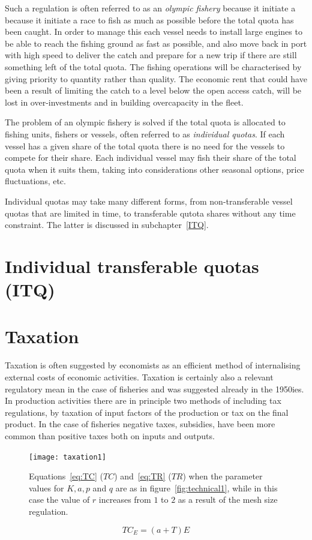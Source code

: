 \documentclass[11pt,fleqn]{book} %
\begin{document}
Such a regulation is often referred to as an \textit{olympic fishery} because it initiate a because it initiate a race to fish as much as possible before the total quota has been caught. In order to manage this each vessel needs to install large engines to be able to reach the fishing ground as fast as possible, and also move back in port with high speed to deliver the catch and prepare for a new trip if there are still something left of the total quota. The fishing operations will be characterised by giving priority to quantity rather than quality. The economic rent that could have been a result of limiting the catch to a level below the open access catch, will be lost in over-investments and in building overcapacity in the fleet.

The problem of an olympic fishery is solved if the total quota is allocated to fishing units, fishers or vessels, often referred to as \textit{individual quotas}. If each vessel has a given share of the total quota there is no need for the vessels to compete for their share. Each individual vessel may fish their share of the total quota when it suits them, taking into considerations other seasonal options, price fluctuations, etc. 

Individual quotas may take many different forms, from non-transferable vessel quotas that are limited in time, to transferable qutota shares without any time constraint. The latter is discussed in subchapter~\ref{ITQ}.

\section{Individual transferable quotas (ITQ)} \label{ITQ}

\section{Taxation} \label{tax:effort}

Taxation is often suggested by economists as an efficient method of internalising external costs of economic activities. Taxation is certainly also a relevant regulatory mean in the case of fisheries and was suggested already in the 1950ies\cite{Gordon1954}. In production activities there are in principle two methods of including tax regulations, by taxation of input factors of the production or tax on the final product. In the case of fisheries negative taxes, subsidies, have been more common than positive taxes both on inputs and outputs.
\hfill
\begin{figure}[ht]
\centering
\texttt{[image: taxation1]}
\caption{Equations~\ref{eq:TC} ($TC$) and~\ref{eq:TR} ($TR$) when the parameter values for $K, a, p$ and $q$ are as in figure~\ref{fig:technical1}, while in this case the value of $r$ increases from $1$ to $2$ as a result of the mesh size regulation.}
\label{fig:taxation1}
\end{figure}
\begin{equation} 
\label{eq:tax on effort}
  TC_E = (a + T) E
\end{equation}
\end{document}

